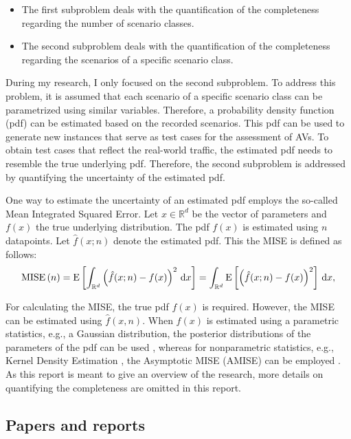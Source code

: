 \begin{itemize}
	\item The first subproblem deals with the quantification of the completeness regarding the number of scenario classes. 
	\item The second subproblem deals with the quantification of the completeness regarding the scenarios of a specific scenario class.
\end{itemize}

During my research, I only focused on the second subproblem. To address this problem, it is assumed that each scenario of a specific scenario class can be parametrized using similar variables. Therefore, a probability density function (pdf) can be estimated based on the recorded scenarios. This pdf can be used to generate new instances that serve as test cases for the assessment of AVs. To obtain test cases that reflect the real-world traffic, the estimated pdf needs to resemble the true underlying pdf. Therefore, the second subproblem is addressed by quantifying the uncertainty of the estimated pdf.

One way to estimate the uncertainty of an estimated pdf employs the so-called Mean Integrated Squared Error. Let $x \in \mathbb{R}^d$ be the vector of parameters and $f(x)$ the true underlying distribution. The pdf $f(x)$ is estimated using $n$ datapoints. Let $\hat{f}(x;n)$ denote the estimated pdf. This the MISE is defined as follows:
\begin{equation} \label{eq:mise}
	\textup{MISE} \left( n \right) = \textup{E} \left[  \int_{\mathbb{R}^d} \left(\hat{f}(x;n) - f(x)\right)^2 \, \textup{d}x \right] = \int_{\mathbb{R}^d} \textup{E} \left[ \left(\hat{f}(x;n) - f(x)\right)^2 \right] \, \textup{d}x,
\end{equation}

For calculating the MISE, the true pdf $f(x)$ is required. However, the MISE can be estimated using $\hat{f}(x, n)$. When $f(x)$ is estimated using a parametric statistics, e.g., a Gaussian distribution, the posterior distributions of the parameters of the pdf can be used \cite{bishop2006pattern}, whereas for nonparametric statistics, e.g., Kernel Density Estimation \cite{rosenblatt1956remarks, parzen1962estimation}, the Asymptotic MISE (AMISE) can be employed \cite{chen2017tutorial}. As this report is meant to give an overview of the research, more details on quantifying the completeness are omitted in this report.

\subsection{Papers and reports}
\label{sec:paper}

